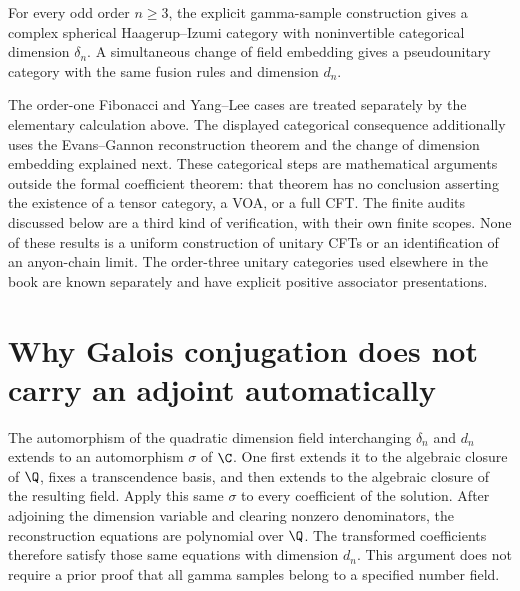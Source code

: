 \begin{theorem}
For every odd order $n\geq3$, the explicit gamma-sample construction
gives a complex spherical Haagerup--Izumi category with noninvertible
categorical dimension $\delta_n$.  A simultaneous change of field
embedding gives a pseudounitary category with the same fusion rules
and dimension $d_n$.
\end{theorem}

The order-one Fibonacci and Yang--Lee cases are treated separately
by the elementary calculation above. The displayed categorical
consequence additionally uses the Evans--Gannon reconstruction
theorem and the change of dimension embedding explained next.
These categorical steps are mathematical arguments outside the
formal coefficient theorem: that theorem has no conclusion asserting
the existence of a tensor category, a VOA, or a full CFT. The finite
audits discussed below are a third kind of verification, with their
own finite scopes. None of these results is a uniform construction
of unitary CFTs or an identification of an anyon-chain limit.
The order-three unitary categories used elsewhere in the book are
known separately and have explicit positive associator presentations.

\section{Why Galois conjugation does not carry an adjoint automatically}

The automorphism of the quadratic dimension field interchanging
$\delta_n$ and $d_n$ extends to an automorphism $\sigma$ of
$\C$.  One first extends it to the algebraic closure of $\Q$,
fixes a transcendence basis, and then extends to the algebraic
closure of the resulting field.  Apply this same $\sigma$ to
every coefficient of the solution.  After adjoining the dimension
variable and clearing nonzero denominators, the reconstruction
equations are polynomial over $\Q$.  The transformed coefficients
therefore satisfy those same equations with dimension $d_n$.
This argument does not require a prior proof that all gamma samples
belong to a specified number field.

